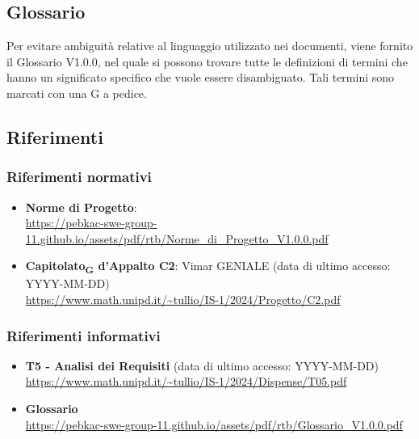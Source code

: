 \subsection{Glossario}
Per evitare ambiguità relative al linguaggio utilizzato nei documenti, viene fornito il Glossario V1.0.0, nel quale si possono trovare tutte le definizioni di termini che hanno un significato specifico che vuole essere disambiguato. Tali termini sono marcati con una G a pedice.
\subsection{Riferimenti}
\subsubsection{Riferimenti  normativi}  
\begin{itemize}
    \item \textbf{Norme di Progetto}:\\
    \url{https://pebkac-swe-group-11.github.io/assets/pdf/rtb/Norme_di_Progetto_V1.0.0.pdf} 

    \item \textbf{Capitolato\textsubscript{G} d'Appalto C2}: Vimar GENIALE (data di ultimo accesso: YYYY-MM-DD)\\
    \url{https://www.math.unipd.it/~tullio/IS-1/2024/Progetto/C2.pdf}
\end{itemize}
\subsubsection{Riferimenti informativi}
\begin{itemize}
    \item \textbf{T5 - Analisi dei Requisiti} (data di ultimo accesso: YYYY-MM-DD)\\
    \url{https://www.math.unipd.it/~tullio/IS-1/2024/Dispense/T05.pdf}
    
    \item \textbf{Glossario} \\
    \url{https://pebkac-swe-group-11.github.io/assets/pdf/rtb/Glossario_V1.0.0.pdf}
\end{itemize}

